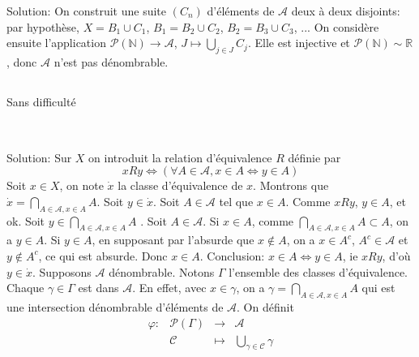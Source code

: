 \documentclass{report}
\begin{document}
Solution: On construit une suite $(C_n)$ d'éléments de $\mathcal A$ deux à deux disjoints: par hypothèse, $X = B_1\cup C_1$, $B_1=B_2\cup C_2$, $B_2=B_3\cup C_3$, ... On considère ensuite l'application $\mathcal P( \mathbb N) \to \mathcal A$, $J \mapsto \bigcup_{j\in J} C_j$. Elle est injective et $\mathcal P( \mathbb N) \sim \mathbb R$, donc $\mathcal A$ n'est pas dénombrable.

\subsection{} Sans difficulté

\subsection{}  \\

Solution: Sur $X$ on introduit la relation d'équivalence $R$ définie par  $$xRy\iff \left(\forall A\in \mathcal A, x\in A \iff y\in A\right)$$ Soit $x\in X$, on note $\dot x$ la classe d'équivalence de $x$. Montrons que $\displaystyle \dot x = \bigcap_{A\in \mathcal A, x\in A}A$.\newline
\fbox{$\subset$}  Soit $y\in \dot x$. Soit $A\in \mathcal A$ tel que $x\in A$. Comme $xRy$, $y\in A$, et ok.\newline
\fbox{$\supset$} Soit $y\in \bigcap_{A\in \mathcal A, x\in A}A$ . Soit $A\in \mathcal A$. Si $x\in A$, comme $\bigcap_{A\in \mathcal A, x\in A}A \subset A$, \newline on a $y\in A$. Si $y\in A$, en supposant par l'absurde que $x\notin A$, on a $x\in A^c$, $A^c \in \mathcal A$ et  $y\notin A^c$, ce qui est absurde. Donc $x\in A$. Conclusion: $x\in A \iff y\in A$, ie $xRy$, d'où $y\in \dot x$.\newline \newline
Supposons $\mathcal A$ dénombrable.\newline
Notons $\Gamma$ l'ensemble des classes d'équivalence. Chaque $\gamma \in \Gamma$ est dans $\mathcal A$. En effet, avec $x\in \gamma$, on a $\gamma = \bigcap_{A\in \mathcal A, x\in A} A$ qui est une intersection dénombrable d'éléments de $\mathcal A$.\newline
On définit
$$\begin{array}{clcl}
  \varphi : &\mathcal{P}(\Gamma) &\longrightarrow  &\mathcal A\\
      &\mathcal C        &\longmapsto      & \bigcup_{\gamma \in \mathcal C} \gamma \\
\end{array}$$
\end{document}
